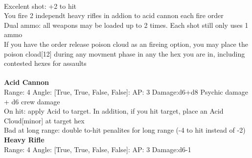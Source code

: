 \ \\
Excelent shot: +2 to hit\\ 
You fire 2 independt heavy rifles in addion to acid cannon each fire order\\ 
Dual ammo: all weapons may be loaded up to 2 times. Each shot still only uses 1 ammo\\ 
If you have the order release poison cloud as an fireing option, you may place the poison cload[12] during any movment phase in any the hex you are in, including contested hexes for assaults\\ 

\ \\
{\bf Acid Cannon } \\



Range: 4  Angle: [True, True, False, False]: AP: 3 Damage:d6+d8 Psychic damage + d6 crew damage \\
On hit: apply Acid to target. In addition, if you hit target, place an Acid Cloud[minor] at target hex\\ 
Bad at long range: double to-hit penalites for long range (-4 to hit instead of -2)\\ 




{\bf Heavy Rifle } \\



Range: 4  Angle: [True, True, False, False]: AP: 3 Damage:d6-1 \\




 
\ \\



